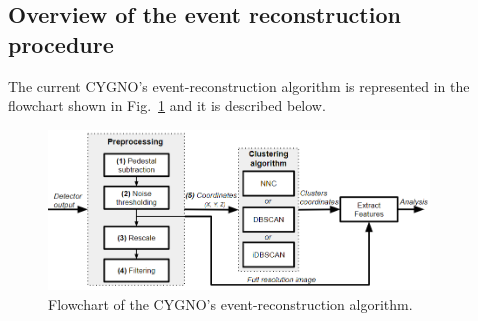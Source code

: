 \documentclass[a4paper,11pt]{article}
\begin{document}
\subsection{Overview of the event reconstruction procedure}

The current CYGNO's event-reconstruction algorithm is represented in the flowchart shown in Fig.~\ref{fig_algo} and it is described below.

\begin{figure}[ht]
\centering
\includegraphics[width=0.9\textwidth]{fluxgram_algorithm.PNG}
\caption{Flowchart of the CYGNO's event-reconstruction algorithm.}
\label{fig_algo}
\end{figure}
\end{document}
